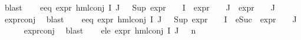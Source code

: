 \begin{isabellebody}
\ blast\isanewline
\ \ \isamarkupfalse%
\ e{}{\isacharunderscore}{\kern0pt}eq{\isacharcolon}{\kern0pt}\ {\isachardoublequoteopen}expr{\isacharunderscore}{\kern0pt}{}\ {\isacharparenleft}{\kern0pt}hml{\isacharunderscore}{\kern0pt}conj\ I\ J\ {\isasymPhi}{\isacharparenright}{\kern0pt}\ {\isacharequal}{\kern0pt}\ {\isacharparenleft}{\kern0pt}Sup\ {\isacharparenleft}{\kern0pt}{\isacharparenleft}{\kern0pt}expr{\isacharunderscore}{\kern0pt}{}\ {\isasymcirc}\ {\isasymPhi}{\isacharparenright}{\kern0pt}\ {\isacharbackquote}{\kern0pt}\ I\ {\isasymunion}\ {\isacharparenleft}{\kern0pt}expr{\isacharunderscore}{\kern0pt}{}\ {\isasymcirc}\ {\isasymPhi}{\isacharparenright}{\kern0pt}\ {\isacharbackquote}{\kern0pt}\ J\ {\isasymunion}\ {\isacharparenleft}{\kern0pt}expr{\isacharunderscore}{\kern0pt}{}\ {\isasymcirc}\ {\isasymPhi}{\isacharparenright}{\kern0pt}\ {\isacharbackquote}{\kern0pt}\ J{\isacharparenright}{\kern0pt}{\isacharparenright}{\kern0pt}{\isachardoublequoteclose}\isanewline
\ \ \ \ \isamarkupfalse%
\ expr{\isacharunderscore}{\kern0pt}{}{\isacharunderscore}{\kern0pt}conj\ \isamarkupfalse%
\ blast\isanewline
\ \ \isamarkupfalse%
\ e{}{\isacharunderscore}{\kern0pt}eq{\isacharcolon}{\kern0pt}\ {\isachardoublequoteopen}expr{\isacharunderscore}{\kern0pt}{}\ {\isacharparenleft}{\kern0pt}hml{\isacharunderscore}{\kern0pt}conj\ I\ J\ {\isasymPhi}{\isacharparenright}{\kern0pt}\ {\isacharequal}{\kern0pt}\ {\isacharparenleft}{\kern0pt}Sup\ {\isacharparenleft}{\kern0pt}{\isacharparenleft}{\kern0pt}expr{\isacharunderscore}{\kern0pt}{}\ {\isasymcirc}\ {\isasymPhi}{\isacharparenright}{\kern0pt}\ {\isacharbackquote}{\kern0pt}\ I\ {\isasymunion}\ {\isacharparenleft}{\kern0pt}{\isacharparenleft}{\kern0pt}eSuc\ {\isasymcirc}\ expr{\isacharunderscore}{\kern0pt}{}\ {\isasymcirc}\ {\isasymPhi}{\isacharparenright}{\kern0pt}\ {\isacharbackquote}{\kern0pt}\ J{\isacharparenright}{\kern0pt}{\isacharparenright}{\kern0pt}{\isacharparenright}{\kern0pt}{\isachardoublequoteclose}\isanewline
\ \ \ \ \isamarkupfalse%
\ expr{\isacharunderscore}{\kern0pt}{}{\isacharunderscore}{\kern0pt}conj\ \isamarkupfalse%
\ blast\isanewline
\isanewline
\ \ \isamarkupfalse%
\ e{}{\isacharunderscore}{\kern0pt}le{\isacharcolon}{\kern0pt}\ {\isachardoublequoteopen}expr{\isacharunderscore}{\kern0pt}{}\ {\isacharparenleft}{\kern0pt}hml{\isacharunderscore}{\kern0pt}conj\ I\ J\ {\isasymPhi}{\isacharparenright}{\kern0pt}\ {\isasymle}\ n{}{\isachardoublequoteclose}\ \isanewline

\end{isabellebody}
